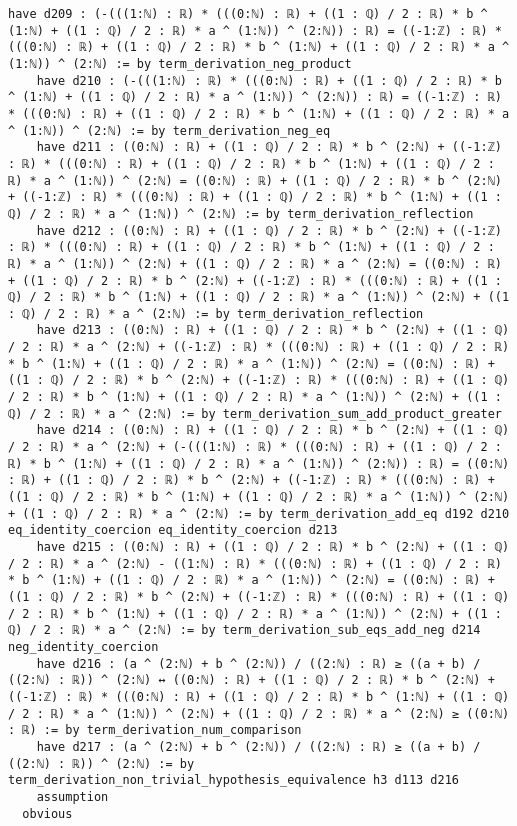 \documentclass{article}
\begin{document}
\begin{tcolorbox}[colback=white!10, width=\linewidth]
\begin{lstlisting}[language=Lean4]
    have d209 : (-(((1:ℕ) : ℝ) * (((0:ℕ) : ℝ) + ((1 : ℚ) / 2 : ℝ) * b ^ (1:ℕ) + ((1 : ℚ) / 2 : ℝ) * a ^ (1:ℕ)) ^ (2:ℕ)) : ℝ) = ((-1:ℤ) : ℝ) * (((0:ℕ) : ℝ) + ((1 : ℚ) / 2 : ℝ) * b ^ (1:ℕ) + ((1 : ℚ) / 2 : ℝ) * a ^ (1:ℕ)) ^ (2:ℕ) := by term_derivation_neg_product
    have d210 : (-(((1:ℕ) : ℝ) * (((0:ℕ) : ℝ) + ((1 : ℚ) / 2 : ℝ) * b ^ (1:ℕ) + ((1 : ℚ) / 2 : ℝ) * a ^ (1:ℕ)) ^ (2:ℕ)) : ℝ) = ((-1:ℤ) : ℝ) * (((0:ℕ) : ℝ) + ((1 : ℚ) / 2 : ℝ) * b ^ (1:ℕ) + ((1 : ℚ) / 2 : ℝ) * a ^ (1:ℕ)) ^ (2:ℕ) := by term_derivation_neg_eq
    have d211 : ((0:ℕ) : ℝ) + ((1 : ℚ) / 2 : ℝ) * b ^ (2:ℕ) + ((-1:ℤ) : ℝ) * (((0:ℕ) : ℝ) + ((1 : ℚ) / 2 : ℝ) * b ^ (1:ℕ) + ((1 : ℚ) / 2 : ℝ) * a ^ (1:ℕ)) ^ (2:ℕ) = ((0:ℕ) : ℝ) + ((1 : ℚ) / 2 : ℝ) * b ^ (2:ℕ) + ((-1:ℤ) : ℝ) * (((0:ℕ) : ℝ) + ((1 : ℚ) / 2 : ℝ) * b ^ (1:ℕ) + ((1 : ℚ) / 2 : ℝ) * a ^ (1:ℕ)) ^ (2:ℕ) := by term_derivation_reflection
    have d212 : ((0:ℕ) : ℝ) + ((1 : ℚ) / 2 : ℝ) * b ^ (2:ℕ) + ((-1:ℤ) : ℝ) * (((0:ℕ) : ℝ) + ((1 : ℚ) / 2 : ℝ) * b ^ (1:ℕ) + ((1 : ℚ) / 2 : ℝ) * a ^ (1:ℕ)) ^ (2:ℕ) + ((1 : ℚ) / 2 : ℝ) * a ^ (2:ℕ) = ((0:ℕ) : ℝ) + ((1 : ℚ) / 2 : ℝ) * b ^ (2:ℕ) + ((-1:ℤ) : ℝ) * (((0:ℕ) : ℝ) + ((1 : ℚ) / 2 : ℝ) * b ^ (1:ℕ) + ((1 : ℚ) / 2 : ℝ) * a ^ (1:ℕ)) ^ (2:ℕ) + ((1 : ℚ) / 2 : ℝ) * a ^ (2:ℕ) := by term_derivation_reflection
    have d213 : ((0:ℕ) : ℝ) + ((1 : ℚ) / 2 : ℝ) * b ^ (2:ℕ) + ((1 : ℚ) / 2 : ℝ) * a ^ (2:ℕ) + ((-1:ℤ) : ℝ) * (((0:ℕ) : ℝ) + ((1 : ℚ) / 2 : ℝ) * b ^ (1:ℕ) + ((1 : ℚ) / 2 : ℝ) * a ^ (1:ℕ)) ^ (2:ℕ) = ((0:ℕ) : ℝ) + ((1 : ℚ) / 2 : ℝ) * b ^ (2:ℕ) + ((-1:ℤ) : ℝ) * (((0:ℕ) : ℝ) + ((1 : ℚ) / 2 : ℝ) * b ^ (1:ℕ) + ((1 : ℚ) / 2 : ℝ) * a ^ (1:ℕ)) ^ (2:ℕ) + ((1 : ℚ) / 2 : ℝ) * a ^ (2:ℕ) := by term_derivation_sum_add_product_greater
    have d214 : ((0:ℕ) : ℝ) + ((1 : ℚ) / 2 : ℝ) * b ^ (2:ℕ) + ((1 : ℚ) / 2 : ℝ) * a ^ (2:ℕ) + (-(((1:ℕ) : ℝ) * (((0:ℕ) : ℝ) + ((1 : ℚ) / 2 : ℝ) * b ^ (1:ℕ) + ((1 : ℚ) / 2 : ℝ) * a ^ (1:ℕ)) ^ (2:ℕ)) : ℝ) = ((0:ℕ) : ℝ) + ((1 : ℚ) / 2 : ℝ) * b ^ (2:ℕ) + ((-1:ℤ) : ℝ) * (((0:ℕ) : ℝ) + ((1 : ℚ) / 2 : ℝ) * b ^ (1:ℕ) + ((1 : ℚ) / 2 : ℝ) * a ^ (1:ℕ)) ^ (2:ℕ) + ((1 : ℚ) / 2 : ℝ) * a ^ (2:ℕ) := by term_derivation_add_eq d192 d210 eq_identity_coercion eq_identity_coercion d213
    have d215 : ((0:ℕ) : ℝ) + ((1 : ℚ) / 2 : ℝ) * b ^ (2:ℕ) + ((1 : ℚ) / 2 : ℝ) * a ^ (2:ℕ) - ((1:ℕ) : ℝ) * (((0:ℕ) : ℝ) + ((1 : ℚ) / 2 : ℝ) * b ^ (1:ℕ) + ((1 : ℚ) / 2 : ℝ) * a ^ (1:ℕ)) ^ (2:ℕ) = ((0:ℕ) : ℝ) + ((1 : ℚ) / 2 : ℝ) * b ^ (2:ℕ) + ((-1:ℤ) : ℝ) * (((0:ℕ) : ℝ) + ((1 : ℚ) / 2 : ℝ) * b ^ (1:ℕ) + ((1 : ℚ) / 2 : ℝ) * a ^ (1:ℕ)) ^ (2:ℕ) + ((1 : ℚ) / 2 : ℝ) * a ^ (2:ℕ) := by term_derivation_sub_eqs_add_neg d214 neg_identity_coercion
    have d216 : (a ^ (2:ℕ) + b ^ (2:ℕ)) / ((2:ℕ) : ℝ) ≥ ((a + b) / ((2:ℕ) : ℝ)) ^ (2:ℕ) ↔ ((0:ℕ) : ℝ) + ((1 : ℚ) / 2 : ℝ) * b ^ (2:ℕ) + ((-1:ℤ) : ℝ) * (((0:ℕ) : ℝ) + ((1 : ℚ) / 2 : ℝ) * b ^ (1:ℕ) + ((1 : ℚ) / 2 : ℝ) * a ^ (1:ℕ)) ^ (2:ℕ) + ((1 : ℚ) / 2 : ℝ) * a ^ (2:ℕ) ≥ ((0:ℕ) : ℝ) := by term_derivation_num_comparison
    have d217 : (a ^ (2:ℕ) + b ^ (2:ℕ)) / ((2:ℕ) : ℝ) ≥ ((a + b) / ((2:ℕ) : ℝ)) ^ (2:ℕ) := by term_derivation_non_trivial_hypothesis_equivalence h3 d113 d216
    assumption
  obvious

\end{lstlisting}
\end{tcolorbox}
\end{document}
